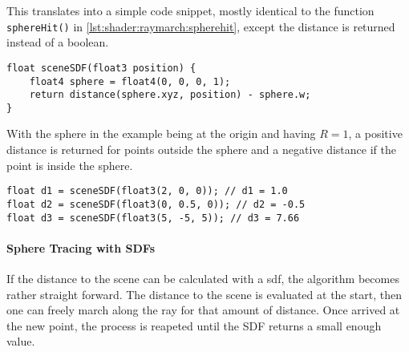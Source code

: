 \noindent
This translates into a simple code snippet, mostly identical to the function \lstinline[language=HLSL]{sphereHit()} in \autoref{lst:shader:raymarch:spherehit}, except the distance is returned instead of a boolean.
\begin{lstlisting}[language=HLSL, caption=Implementation of a signed distance function for a sphere., label=lst:shader:raymarch:spheredistance]
float sceneSDF(float3 position) {
    float4 sphere = float4(0, 0, 0, 1);
    return distance(sphere.xyz, position) - sphere.w;
}
\end{lstlisting}

\noindent
With the sphere in the example being at the origin and having $R = 1$, a positive distance is returned for points outside the sphere and a negative distance if the point is inside the sphere.
\begin{lstlisting}[language=HLSL]
float d1 = sceneSDF(float3(2, 0, 0)); // d1 = 1.0
float d2 = sceneSDF(float3(0, 0.5, 0)); // d2 = -0.5
float d3 = sceneSDF(float3(5, -5, 5)); // d3 = 7.66
\end{lstlisting}

\paragraph{Sphere Tracing with SDFs}
If the distance to the scene can be calculated with a \gls{sdf}, the algorithm becomes rather straight forward. The distance to the scene is evaluated at the start, then one can freely march along the ray for that amount of distance. Once arrived at the new point, the process is reapeted until the SDF returns a small enough value.

